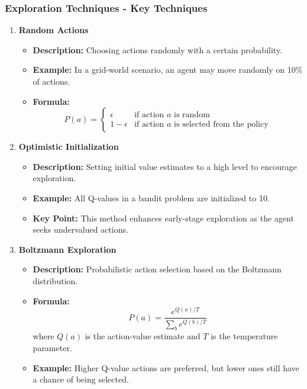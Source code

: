 \documentclass[aspectratio=169]{beamer}
\begin{document}
\begin{frame}[fragile]
    \frametitle{Exploration Techniques - Key Techniques}
    \begin{enumerate}
        \item \textbf{Random Actions}
            \begin{itemize}
                \item \textbf{Description:} Choosing actions randomly with a certain probability. 
                \item \textbf{Example:} In a grid-world scenario, an agent may move randomly on 10\% of actions.
                \item \textbf{Formula:}
                    \begin{equation}
                    P(a) = 
                    \begin{cases} 
                    \epsilon & \text{if action } a \text{ is random} \\
                    1 - \epsilon & \text{if action } a \text{ is selected from the policy}
                    \end{cases}
                    \end{equation}
            \end{itemize}

        \item \textbf{Optimistic Initialization}
            \begin{itemize}
                \item \textbf{Description:} Setting initial value estimates to a high level to encourage exploration.
                \item \textbf{Example:} All Q-values in a bandit problem are initialized to 10.
                \item \textbf{Key Point:} This method enhances early-stage exploration as the agent seeks undervalued actions.
            \end{itemize}

        \item \textbf{Boltzmann Exploration}
            \begin{itemize}
                \item \textbf{Description:} Probabilistic action selection based on the Boltzmann distribution.
                \item \textbf{Formula:}
                    \begin{equation}
                    P(a) = \frac{e^{Q(a)/T}}{\sum_{b} e^{Q(b)/T}}
                    \end{equation}
                    where \( Q(a) \) is the action-value estimate and \( T \) is the temperature parameter.
                \item \textbf{Example:} Higher Q-value actions are preferred, but lower ones still have a chance of being selected.
            \end{itemize}
    \end{enumerate}
\end{frame}
\end{document}
